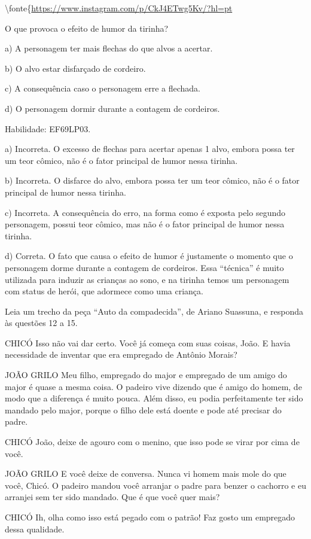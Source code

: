 {\textbackslash fonte\{\url{https://www.instagram.com/p/CkJ4ETwg5Kv/?hl=pt}

O que provoca o efeito de humor da tirinha?

a) A personagem ter mais flechas do que alvos a acertar.

b) O alvo estar disfarçado de cordeiro.

c) A consequência caso o personagem erre a flechada.

d) O personagem dormir durante a contagem de cordeiros.

Habilidade: EF69LP03.

a) Incorreta. O excesso de flechas para acertar apenas 1 alvo, embora
possa ter um teor cômico, não é o fator principal de humor nessa
tirinha.

b) Incorreta. O disfarce do alvo, embora possa ter um teor cômico, não é
o fator principal de humor nessa tirinha.

c) Incorreta. A consequência do erro, na forma como é exposta pelo
segundo personagem, possui teor cômico, mas não é o fator principal de
humor nessa tirinha.

d) Correta. O fato que causa o efeito de humor é justamente o momento
que o personagem dorme durante a contagem de cordeiros. Essa ``técnica''
é muito utilizada para induzir as crianças ao sono, e na tirinha temos
um personagem com status de herói, que adormece como uma criança.

Leia um trecho da peça ``Auto da compadecida'', de Ariano Suassuna, e
responda às questões 12 a 15.

CHICÓ Isso não vai dar certo. Você já começa com suas coisas, João. E
havia necessidade de inventar que era empregado de Antônio Morais?

JOÃO GRILO Meu filho, empregado do major e empregado de um amigo do
major é quase a mesma coisa. O padeiro vive dizendo que é amigo do
homem, de modo que a diferença é muito pouca. Além disso, eu podia
perfeitamente ter sido mandado pelo major, porque o filho dele está
doente e pode até precisar do padre.

CHICÓ João, deixe de agouro com o menino, que isso pode se virar por
cima de você.

JOÃO GRILO E você deixe de conversa. Nunca vi homem mais mole do que
você, Chicó. O padeiro mandou você arranjar o padre para benzer o
cachorro e eu arranjei sem ter sido mandado. Que é que você quer mais?

CHICÓ Ih, olha como isso está pegado com o patrão! Faz gosto um
empregado dessa qualidade.

}
